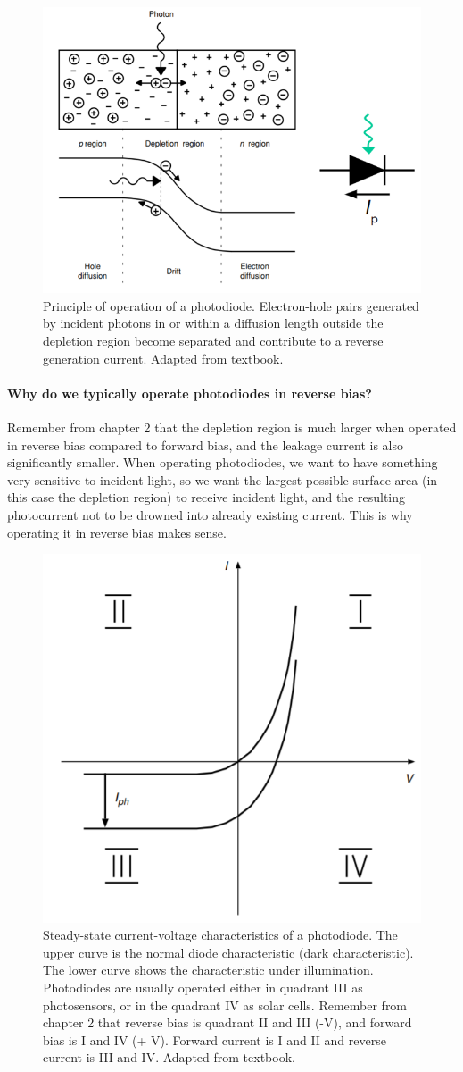 \begin{figure}[H]
    \centering
    \includegraphics[width=0.5\linewidth]{../../Figures/Photodiode.PNG}
    \caption{Principle of operation of a photodiode. Electron-hole pairs generated by incident photons in or within a diffusion length outside the depletion region become separated and contribute to a reverse generation current. Adapted from textbook.}
    \label{fig:Photodiode}
\end{figure}


\paragraph{Why do we typically operate photodiodes in reverse bias?} Remember from chapter 2 that the depletion region is much larger when operated in reverse bias compared to forward bias, and the leakage current is also significantly smaller. When operating photodiodes, we want to have something very sensitive to incident light, so we want the largest possible surface area (in this case the depletion region) to receive incident light, and the resulting photocurrent not to be drowned into already existing current. This is why operating it in reverse bias makes sense.

\begin{figure}[H]
    \centering
    \includegraphics[width=0.5\linewidth]{../../Figures/Photodiode_Operation.PNG}
    \caption{Steady-state current-voltage characteristics of a photodiode. The upper curve is the normal diode characteristic (dark characteristic). The lower curve shows the characteristic under illumination. Photodiodes are usually operated either in quadrant III as photosensors, or in the quadrant IV as solar cells. Remember from chapter 2 that reverse bias is quadrant II and III (-V), and forward bias is I and IV (+ V). Forward current is I and II and reverse current is III and IV. Adapted from textbook.}
    \label{fig:Photodiode_Operation}
\end{figure}

